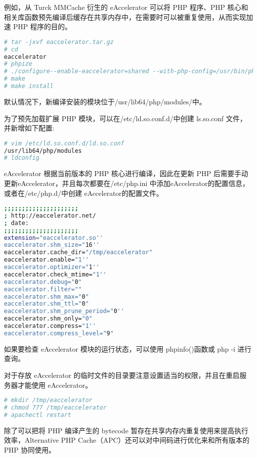 例如，从 Turck MMCache 衍生的 eAccelerator 可以将 PHP 程序、PHP 核心和相关库函数预先编译后缓存在共享内存中，在需要时可以被重复使用，从而实现加速 PHP 程序的目的。


\begin{lstlisting}[language=bash]
# tar -jxvf eaccelerator.tar.gz
# cd
eaccelerator
# phpize
# ./configure--enable-eaccelerator=shared --with-php-config=/usr/bin/php-config
# make
# make install
\end{lstlisting}


默认情况下，新编译安装的模块位于/usr/lib64/php/modules/中。

为了预先加载扩展 PHP 模块，可以在/etc/ld.so.conf.d/中创建 ls.so.conf 文件，并新增如下配置:



\begin{lstlisting}[language=bash]
# vim /etc/ld.so.conf.d/ld.so.conf
/usr/lib64/php/modules
# ldconfig
\end{lstlisting}

eAccelerator 根据当前版本的 PHP 核心进行编译，因此在更新 PHP 后需要手动更新eAccelerator，并且每次都要在/etc/php.ini 中添加eAccelerator的配置信息，或者在/etc/php.d/中创建 eAccelerator的配置文件。




\begin{lstlisting}[language=bash]
;;;;;;;;;;;;;;;;;;;;;
; http://eaccelerator.net/
; date:
;;;;;;;;;;;;;;;;;;;;;
extension="eaccelerator.so''
eaccelerator.shm_size="16''
eaccelerator.cache_dir="/tmp/eaccelerator"
eaccelerator.enable="1''
eaccelerator.optimizer="1''
eaccelerator.check_mtime="1''
eaccelerator.debug="0"
eaccelerator.filter=""
eaccelerator.shm_max="0"
eaccelerator.shm_ttl="0"
eaccelerator.shm_prune_period="0''
eaccelerator.shm_only="0"
eaccelerator.compress="1''
eaccelerator.compress_level="9"
\end{lstlisting}


如果要检查 eAccelerator 模块的运行状态，可以使用 phpinfo()函数或 php -i 进行查询。

对于存放 eAccelerator 的临时文件的目录要注意设置适当的权限，并且在重启服务器才能使用 eAccelerator。



\begin{lstlisting}[language=bash]
# mkdir /tmp/eaccelerator
# chmod 777 /tmp/eaccelerator
# apachectl restart
\end{lstlisting}


除了可以把将 PHP 编译产生的 bytecode 暂存在共享内存内重复使用来提高执行效率，Alternative PHP Cache（APC）还可以对中间码进行优化来和所有版本的 PHP 协同使用。



